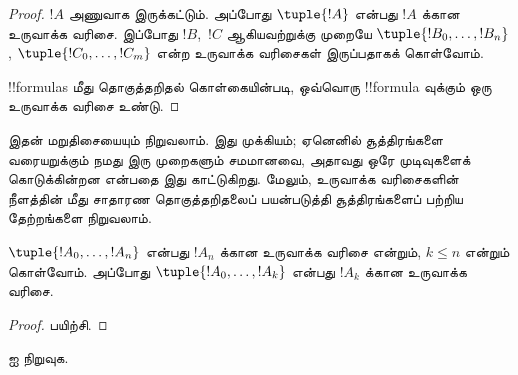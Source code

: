 \documentclass[../../../include/open-logic-section]{subfiles}
\begin{document}
\begin{proof}
$!A$ அணுவாக இருக்கட்டும். அப்போது $\tuple{!A}$ என்பது $!A$ க்கான உருவாக்க
வரிசை.
%
இப்போது $!B$,~$!C$ ஆகியவற்றுக்கு முறையே
$\tuple{!B_0,\dotsc,!B_n}$, $\tuple{!C_0,\dotsc,!C_m}$ என்ற உருவாக்க
வரிசைகள் இருப்பதாகக் கொள்வோம்.
%
\begin{enumerate}
\end{enumerate}
!!{formula}s மீது தொகுத்தறிதல் கொள்கையின்படி, ஒவ்வொரு !!{formula} வுக்கும்
ஒரு உருவாக்க வரிசை உண்டு.
\end{proof}

இதன் மறுதிசையையும் நிறுவலாம். இது முக்கியம்; ஏனெனில் சூத்திரங்களை
வரையறுக்கும் நமது இரு முறைகளும் சமமானவை, அதாவது ஒரே முடிவுகளைக் கொடுக்கின்றன
என்பதை இது காட்டுகிறது. மேலும், உருவாக்க வரிசைகளின் நீளத்தின் மீது சாதாரண
தொகுத்தறிதலைப் பயன்படுத்தி சூத்திரங்களைப் பற்றிய தேற்றங்களை நிறுவலாம்.

\begin{lem}
$\tuple{!A_0,\dotsc,!A_n}$ என்பது $!A_n$ க்கான உருவாக்க வரிசை என்றும்,
$k \leq n$ என்றும் கொள்வோம். அப்போது $\tuple{!A_0,\dotsc,!A_k}$ என்பது
$!A_k$ க்கான உருவாக்க வரிசை.
\end{lem}

\begin{proof}
பயிற்சி.
\end{proof}

\begin{prob}
 ஐ நிறுவுக.
\end{prob}
\end{document}
